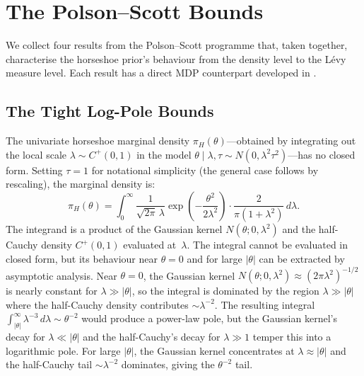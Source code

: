 \documentclass[12pt]{article}
\newcommand{\abs}[1]{\lvert #1 \rvert}
\newcommand{\piH}{\pi_H}
\begin{document}
\section{The Polson--Scott Bounds}\label{sec:ps-bounds}

We collect four results from the Polson--Scott programme that, taken together, characterise the horseshoe prior's behaviour from the density level to the L\'evy measure level. Each result has a direct MDP counterpart developed in .

\subsection{The Tight Log-Pole Bounds}\label{sec:logpole}

The univariate horseshoe marginal density $\piH(\theta)$---obtained by integrating out the local scale $\lambda \sim C^+(0,1)$ in the model $\theta \mid \lambda, \tau \sim N(0, \lambda^2 \tau^2)$---has no closed form. Setting $\tau = 1$ for notational simplicity (the general case follows by rescaling), the marginal density is:
\begin{equation}\label{eq:marginal-integral}
  \piH(\theta) = \int_0^\infty \frac{1}{\sqrt{2\pi}\,\lambda}\exp\!\left(-\frac{\theta^2}{2\lambda^2}\right) \cdot \frac{2}{\pi(1+\lambda^2)}\, d\lambda.
\end{equation}
The integrand is a product of the Gaussian kernel $N(\theta; 0, \lambda^2)$ and the half-Cauchy density $C^+(0,1)$ evaluated at~$\lambda$. The integral cannot be evaluated in closed form, but its behaviour near $\theta = 0$ and for large $\abs{\theta}$ can be extracted by asymptotic analysis. Near $\theta = 0$, the Gaussian kernel $N(\theta; 0, \lambda^2) \approx (2\pi\lambda^2)^{-1/2}$ is nearly constant for $\lambda \gg \abs{\theta}$, so the integral is dominated by the region $\lambda \gg \abs{\theta}$ where the half-Cauchy density contributes $\sim \lambda^{-2}$. The resulting integral $\int_{\abs{\theta}}^\infty \lambda^{-3}\, d\lambda \sim \theta^{-2}$ would produce a power-law pole, but the Gaussian kernel's decay for $\lambda \ll \abs{\theta}$ and the half-Cauchy's decay for $\lambda \gg 1$ temper this into a logarithmic pole. For large $\abs{\theta}$, the Gaussian kernel concentrates at $\lambda \approx \abs{\theta}$ and the half-Cauchy tail $\sim \lambda^{-2}$ dominates, giving the $\theta^{-2}$ tail.
\end{document}
